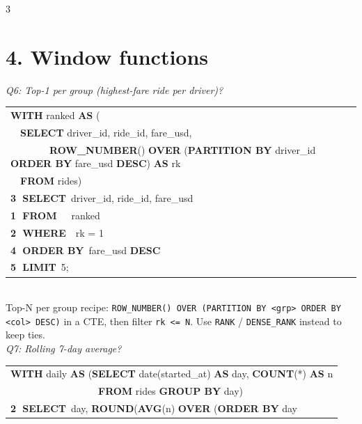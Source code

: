 \documentclass[landscape,letterpaper,9pt]{extarticle}
\begin{document}
\begin{multicols*}{3}
\section*{4. Window functions}
\textit{\scriptsize Q6: Top-1 per group (highest-fare ride per driver)?}\\[1pt]
\colorbox{black!4}{%
\begin{minipage}{\dimexpr\linewidth-2pt}
{\ttfamily\scriptsize
\begin{tabular}{@{}l@{}}
\textbf{WITH} ranked \textbf{AS} ( \\
~~\textbf{SELECT} driver\_id, ride\_id, fare\_usd, \\
~~~~~~~~\textbf{ROW\_NUMBER}() \textbf{OVER} (\textbf{PARTITION BY} driver\_id \textbf{ORDER BY} fare\_usd \textbf{DESC}) \textbf{AS} rk \\
~~\textbf{FROM} rides) \\
\textcolor{stepGroup}{\textbf{\textcircled{\scriptsize 3} SELECT}~driver\_id, ride\_id, fare\_usd} \\
\textcolor{stepFrom}{\textbf{\textcircled{\scriptsize 1} FROM}~~~ranked} \\
\textcolor{stepWhere}{\textbf{\textcircled{\scriptsize 2} WHERE}~~rk = 1} \\
\textcolor{stepHaving}{\textbf{\textcircled{\scriptsize 4} ORDER BY}~fare\_usd \textbf{DESC}} \\
\textcolor{stepSelect}{\textbf{\textcircled{\scriptsize 5} LIMIT}~5;} \\
\end{tabular}}
\end{minipage}}
\\[1pt]
\textcolor{cmt}{\scriptsize Top-N per group recipe: \texttt{ROW\_NUMBER() OVER (PARTITION BY <grp> ORDER BY <col> DESC)} in a CTE, then filter \texttt{rk <= N}. Use \texttt{RANK} / \texttt{DENSE\_RANK} instead to keep ties.}\\[3pt]
\textit{\scriptsize Q7: Rolling 7-day average?}\\[1pt]
\colorbox{black!4}{%
\begin{minipage}{\dimexpr\linewidth-2pt}
{\ttfamily\scriptsize
\begin{tabular}{@{}l@{}}
\textbf{WITH} daily \textbf{AS} (\textbf{SELECT} date(started\_at) \textbf{AS} day, \textbf{COUNT}(*) \textbf{AS} n \\
~~~~~~~~~~~~~~~~~~\textbf{FROM} rides \textbf{GROUP BY} day) \\
\textcolor{stepWhere}{\textbf{\textcircled{\scriptsize 2} SELECT}~day, \textbf{ROUND}(\textbf{AVG}(n) \textbf{OVER} (\textbf{ORDER BY} day} \\

\end{tabular}}
\end{minipage}}
\end{multicols*}
\end{document}
